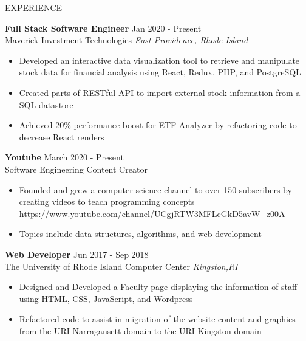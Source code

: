 \begin{rSection}{EXPERIENCE}

	\textbf{Full Stack Software Engineer} \hfill Jan 2020 - Present\\
	Maverick Investment Technologies \hfill \textit{East Providence, Rhode Island}
	 \begin{itemize}
			     \itemsep -3pt {} 
				         \item Developed an interactive data visualization tool to retrieve and manipulate stock data for financial analysis using React, Redux, PHP, and PostgreSQL
						     
						     \item Created parts of RESTful API to import external stock information from a SQL datastore 
							          \item Achieved 20\% performance boost for ETF Analyzer by refactoring code to decrease React renders
									   \end{itemize}
									    
									    \textbf{Youtube} \hfill  March 2020 - Present\\
									    Software Engineering Content Creator \hfill 
									     \begin{itemize}
											         \itemsep -3pt {} 
													      \item Founded and grew a computer science channel to over 150 subscribers by creating videos to teach programming concepts 
														           \href{https://www.youtube.com/channel/UCgjRTW3MFLcGkD5avW_z00A}{https://www.youtube.com/channel/UCgjRTW3MFLcGkD5avW_z00A}
															        \item Topics include data structures, algorithms, and web development
																	     
																	   
																	 \end{itemize}
																	  
																	   \textbf{Web Developer} \hfill  Jun 2017 - Sep 2018\\
																	   The University of Rhode Island Computer Center \hfill \textit{Kingston,RI}
																	    \begin{itemize}
																			        \itemsep -3pt {} 
																					     \item Designed and Developed a Faculty page displaying the information of staff using HTML, CSS, JavaScript, and Wordpress
																						          \item Refactored code to assist in migration of the website content and graphics from the URI Narragansett domain to the URI Kingston domain 

																								      
																								   \end{itemize}

\end{rSection} 

